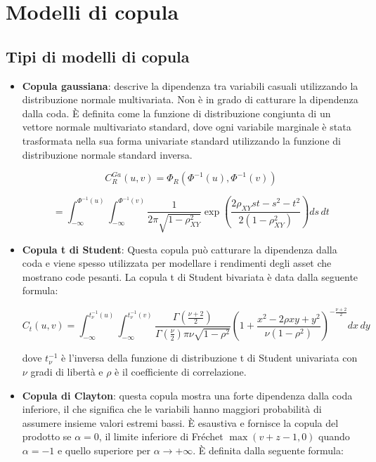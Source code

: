 \documentclass[%
	corpo=11pt,
    twoside,
    stile=classica,
    oldstyle,
    tipotesi=custom,
    greek,
    evenboxes,
]{toptesi}
\begin{document}
\section{Modelli di copula}

\subsection{Tipi di modelli di copula}
\begin{itemize}
	\item \textbf{Copula gaussiana}: descrive la dipendenza tra variabili casuali utilizzando la distribuzione normale multivariata. Non è in grado di catturare la dipendenza dalla coda. È definita come la funzione di distribuzione congiunta di un vettore normale multivariato standard, dove ogni variabile marginale è stata trasformata nella sua forma univariate standard utilizzando la funzione di distribuzione normale standard inversa.
	
	\[
	C_R^{Ga}(u,v) = \Phi_R(\Phi^{-1}(u), \Phi^{-1}(v))
	\]
	
	\[
	= \int_{-\infty}^{\Phi^{-1}(u)} \int_{-\infty}^{\Phi^{-1}(v)} \frac{1}{2\pi \sqrt{1-\rho_{XY}^2}} \exp \left( \frac{2\rho_{XY}st - s^2 - t^2}{2(1-\rho_{XY}^2)} \right) ds \, dt
	\]
	
	\item \textbf{Copula t di Student}: Questa copula può catturare la dipendenza dalla coda e viene spesso utilizzata per modellare i rendimenti degli asset che mostrano code pesanti. La copula t di Student bivariata è data dalla seguente formula:
	
	\[
	C_t(u,v) = \int_{-\infty}^{t_{\nu}^{-1}(u)} \int_{-\infty}^{t_{\nu}^{-1}(v)} \frac{\Gamma \left( \frac{\nu+2}{2} \right)}{\Gamma \left( \frac{\nu}{2} \right) \pi \nu \sqrt{1-\rho^2}} \left(1 + \frac{x^2 -2\rho xy + y^2}{\nu(1-\rho^2)}\right)^{-\frac{\nu+2}{2}} dx \, dy
	\]
	
	dove \( t_{\nu}^{-1} \) è l’inversa della funzione di distribuzione t di Student univariata con \( \nu \) gradi di libertà e \( \rho \) è il coefficiente di correlazione.
	
	\item \textbf{Copula di Clayton}: questa copula mostra una forte dipendenza dalla coda inferiore, il che significa che le variabili hanno maggiori probabilità di assumere insieme valori estremi bassi. È esaustiva e fornisce la copula del prodotto se \( \alpha = 0 \), il limite inferiore di Fréchet \( \max(v+z-1, 0) \) quando \( \alpha = -1 \) e quello superiore per \( \alpha \to +\infty \). È definita dalla seguente formula:
	

\end{itemize}
\end{document}
